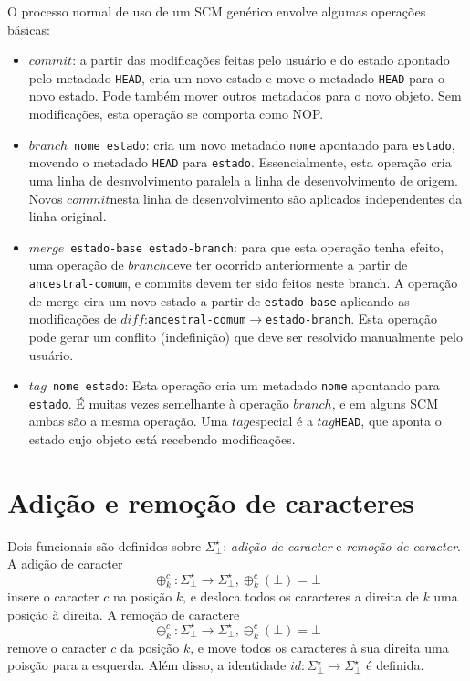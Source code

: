 \documentclass[a4paper]{article}
\newcommand{\co}{{$commit$}}
\newcommand{\diff}{{$diff$}}
\newcommand{\branch}{{$branch$}}
\newcommand{\merge}{{$merge$}}
\newcommand{\mytag}{{$tag$}}
\newcommand{\baseset}{{\Sigma^\star_\bot}}
\newcommand{\opa}{{\oplus^c_k}}
\newcommand{\opb}{{\ominus^c_k}}
\begin{document}
O processo normal de uso de um SCM genérico envolve algumas operações básicas:
\begin{itemize}
\item \co: a partir das modificações feitas pelo usuário e do estado apontado pelo metadado {\tt HEAD}, cria um novo estado e move o metadado {\tt HEAD} para o novo estado. Pode também mover outros metadados para o novo objeto. Sem modificações, esta operação se comporta como NOP. 
\item \branch~{\tt nome}~{\tt estado}: cria um novo metadado {\tt nome} apontando para {\tt estado}, movendo o metadado {\tt HEAD} para {\tt estado}. Essencialmente, esta operação cria uma linha de desnvolvimento paralela a linha de desenvolvimento de origem. Novos \co nesta linha de desenvolvimento são aplicados independentes da linha original.
\item \merge~{\tt estado-base}~{\tt estado-branch}: para que esta operação tenha efeito, uma operação de \branch deve ter ocorrido anteriormente a partir de {\tt ancestral-comum}, e commits devem ter sido feitos neste branch. A operação de merge cira um novo estado a partir de {\tt estado-base} aplicando as modificações de \diff:{\tt ancestral-comum}$ \to ${\tt estado-branch}. Esta operação pode gerar um conflito (indefinição) que deve ser resolvido manualmente pelo usuário.
\item \mytag~{\tt nome}~{\tt estado}: Esta operação cria um metadado {\tt nome} apontando para {\tt estado}. É muitas vezes semelhante à operação \branch, e em alguns SCM ambas são a mesma operação. Uma \mytag especial é a \mytag {\tt HEAD}, que aponta o estado cujo objeto está recebendo modificações.
\end{itemize}

\section*{Adição e remoção de caracteres}
Dois funcionais são definidos sobre $\baseset$: {\it adição de caracter} e {\it remoção de caracter}. A adição de caracter
\begin{equation} \label{eq:oplus}
\opa: \baseset \to \baseset, \opa(\bot) = \bot
\end{equation}
insere o caracter $c$ na posição $k$, e desloca todos os caracteres a direita de $k$ uma posição à direita. A remoção de caractere
\begin{equation} \label{eq:ominus}
\opb: \baseset \to \baseset, \opb(\bot) = \bot
\end{equation}
remove o caracter $c$ da posição $k$, e move todos os caracteres à sua direita uma poisção para a esquerda. Além disso, a identidade $id: \baseset \to \baseset$ é definida.
\end{document}
